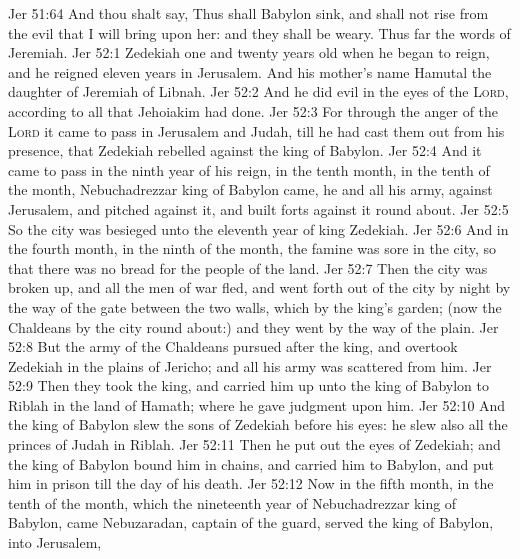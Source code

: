 \vs Jer 51:64 And thou shalt say, Thus shall Babylon sink, and shall not rise from the evil that I will bring upon her: and they shall be weary. Thus far  the words of Jeremiah.
\vs Jer 52:1 Zedekiah  one and twenty years old when he began to reign, and he reigned eleven years in Jerusalem. And his mother's name  Hamutal the daughter of Jeremiah of Libnah.
\vs Jer 52:2 And he did  evil in the eyes of the \textsc{Lord}, according to all that Jehoiakim had done.
\vs Jer 52:3 For through the anger of the \textsc{Lord} it came to pass in Jerusalem and Judah, till he had cast them out from his presence, that Zedekiah rebelled against the king of Babylon.
\vs Jer 52:4 And it came to pass in the ninth year of his reign, in the tenth month, in the tenth  of the month,  Nebuchadrezzar king of Babylon came, he and all his army, against Jerusalem, and pitched against it, and built forts against it round about.
\vs Jer 52:5 So the city was besieged unto the eleventh year of king Zedekiah.
\vs Jer 52:6 And in the fourth month, in the ninth  of the month, the famine was sore in the city, so that there was no bread for the people of the land.
\vs Jer 52:7 Then the city was broken up, and all the men of war fled, and went forth out of the city by night by the way of the gate between the two walls, which  by the king's garden; (now the Chaldeans  by the city round about:) and they went by the way of the plain.
\vs Jer 52:8 But the army of the Chaldeans pursued after the king, and overtook Zedekiah in the plains of Jericho; and all his army was scattered from him.
\vs Jer 52:9 Then they took the king, and carried him up unto the king of Babylon to Riblah in the land of Hamath; where he gave judgment upon him.
\vs Jer 52:10 And the king of Babylon slew the sons of Zedekiah before his eyes: he slew also all the princes of Judah in Riblah.
\vs Jer 52:11 Then he put out the eyes of Zedekiah; and the king of Babylon bound him in chains, and carried him to Babylon, and put him in prison till the day of his death.
\vs Jer 52:12 Now in the fifth month, in the tenth  of the month, which  the nineteenth year of Nebuchadrezzar king of Babylon, came Nebuzaradan, captain of the guard,  served the king of Babylon, into Jerusalem,
